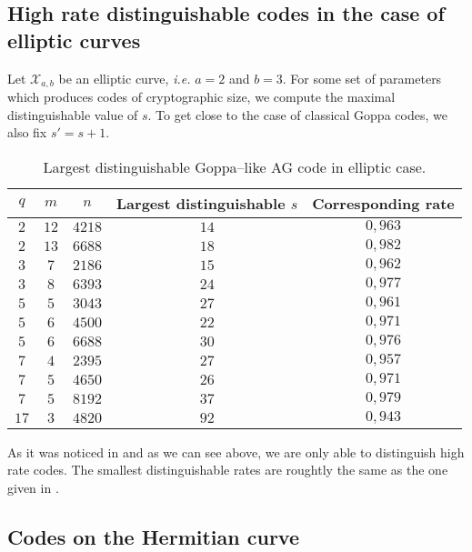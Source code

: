 \documentclass[lettersize,journal]{IEEEtran}
\theoremstyle{plain}
\theoremstyle{definition}
\theoremstyle{remark}
\newcommand{\calX}{\mathcal{X}}
\begin{document}
	\subsection{High rate distinguishable codes in the case of elliptic curves}
	
	Let $\calX_{a,b}$ be an elliptic curve, \emph{i.e.} $a=2$ and $b=3$. For some set of parameters which produces codes of cryptographic size, we compute the maximal distinguishable value of $s$. To get close to the case of classical Goppa codes, we also fix $s'=s+1$.
	\begin{table}[h]
		\begin{center}
			\caption{Largest distinguishable Goppa--like AG code in elliptic case.}
			\begin{tabular}{|c|c|c||c|c|}
				\hline
				$q$ & $m$ & $n$ & Largest distinguishable $s$ & Corresponding rate\\
				\hline \hline
				$2$ & $12$ & $4218$ & $14$ & $0,963$ \\
				\hline 
				$2$ & $13$ & $6688$ & $18$ & $0,982$  \\
				\hline \hline
				$3$ & $7$ & $2186$ & $15$ & $0,962$ \\
				\hline
				$3$ & $8$ & $6393$ & $24$ & $0,977$ \\
				\hline \hline
				$5$ & $5$ & $3043$ & $27$ & $0,961$  \\
				\hline
				$5$ & $6$ & $4500$ & $22$ & $0,971$ \\
				\hline
				$5$  & $6$ & $6688$ & $30$ & $0,976$ \\
				\hline \hline
				$7$ & $4$ & $2395$ & $27$ & $0,957$ \\
				\hline
				$7$ & $5$ & $4650$ & $26$ & $0,971$ \\
				\hline
				$7$ & $5$ & $8192$ & $37$ & $0,979$ \\
				\hline \hline
				$17$ & $3$ & $4820$ & $92$ & $0,943$ \\
				\hline
			\end{tabular}
		\end{center}
	\end{table}
	
	As it was noticed in \cite{MT21} and as we can see above, we are only able to distinguish high rate codes. The smallest distinguishable rates are roughtly the same as the one given in \cite{MT21}. 
	
	\subsection{Codes on the Hermitian curve}
	
\end{document}
